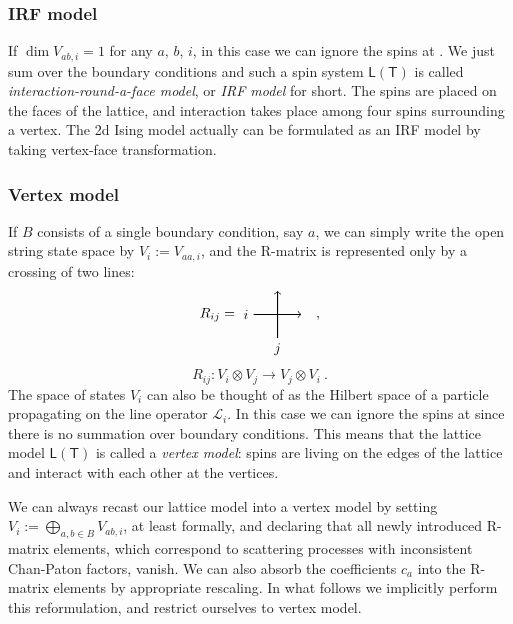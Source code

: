 \subsubsection*{IRF model}

If $\dim V_{ab,i}=1$ for any $a,\,b,\,i$, in this case we can ignore
the spins at . We just sum over the boundary conditions
and such a spin system $\mathsf{L}(\mathsf{T})$ is called
\emph{interaction-round-a-face model}, or \emph{IRF model} for short.
The spins are placed on the faces of the lattice, and interaction
takes place among four spins surrounding a vertex. The 2d Ising model
actually can be formulated as an IRF model by taking vertex-face transformation.


\subsubsection*{Vertex model}

If $B$ consists of a single boundary condition, say $a$, we can
simply write the open string state space by $V_{i}:=V_{aa,i}$, and
the R-matrix is represented only by a crossing of two lines:
\begin{equation}
  R_{ij}
  =
    \begin{tikzpicture}[scale=0.6, baseline=(x.base)]
        \node (x) at (0,0) {\vphantom{x}};

        \draw[thick, ->] (0,0) node[left] {$i$} -- (2,0);
        \draw[thick, ->] (1,-1) node[below] {$j$} -- (1,1);

    \end{tikzpicture}
  \quad ,
\end{equation}
\begin{equation}
  R_{ij}  :  V_{i}\otimes V_{j}  \longrightarrow  V_{j}\otimes V_{i}
  ~ .
\end{equation}
The space of states $V_{i}$ can also be thought of as the Hilbert
space of a particle propagating on the line operator $\mathcal{L}_{i}$.
In this case we can ignore the spins at  since there
is no summation over boundary conditions. This means that the lattice
model $\mathsf{L}(\mathsf{T})$ is called a \emph{vertex
model}: spins are living on the edges of the lattice and interact
with each other at the vertices.

We can always recast our lattice model into a vertex model by setting
$V_{i}:=\bigoplus_{a,b\in B}V_{ab,i}$, at least formally, and declaring
that all newly introduced R-matrix elements, which correspond to scattering
processes with inconsistent Chan-Paton factors, vanish. We can also
absorb the coefficients $c_{a}$ into the R-matrix elements by appropriate
rescaling. In what follows we implicitly perform this reformulation,
and restrict ourselves to vertex model.

